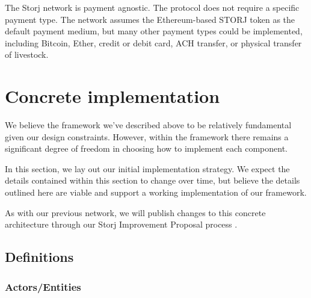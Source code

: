 \documentclass[11pt,fleqn,openany]{book}
\begin{document}
The Storj network is payment agnostic.
The protocol does not require a specific payment type.
The network assumes the Ethereum-based STORJ token as the default payment
medium, but many other payment types could be implemented, including Bitcoin,
Ether, credit or debit card, ACH transfer, or physical transfer of livestock.

\chapter{Concrete implementation}\label{chap:concrete}

We believe the framework we've described above to be relatively fundamental
given our design constraints. However, within the framework there remains a
significant degree of freedom in choosing how to implement each component.

In this section, we lay out our initial implementation strategy. We expect
the details contained within this section to change over time, but believe the
details outlined here are viable and support a working implementation of our
framework.

As with our previous network, we will publish changes to this concrete
architecture through our Storj Improvement Proposal process \cite{sips}.

\section{Definitions}

\subsection{Actors/Entities}
\end{document}
